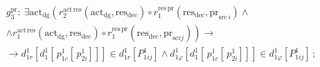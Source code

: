 




\noindent


\begin{multline*}


g_3^{\mathrm{pr}}:\ \exists \mathrm{act}_{\mathrm{dg}}\left( r_2^{\mathrm{act\,res}} \left( 


\mathrm{act}_{\mathrm{dg}}, \mathrm{res}_{\mathrm{dec}}\right)\circ 


r_1^{\mathrm{res\,pr}}


\left( \mathrm{res}_{\mathrm{dec}}, \mathrm{pr}_{\mathrm{src}\,i}\right)\wedge\right.\\


\left.\wedge r_1^{\mathrm{act\,res}} \left( \mathrm{act}_{\mathrm{dg}}, \mathrm{res}_{\mathrm{dec}}\right)


\circ r_1^{\mathrm{res\,pr}}\left( \mathrm{res}_{\mathrm{dec}}, 


\mathrm{pr}_{\mathrm{scr}j}\right)\right)\to{}\\


{}\to d^1_{1r}\left[ d_1^1\left[\, p^1_{1c}\left[\,p^1_{2i}\right]\right]\right]


\in d^1_{1r}\left[ P^1_{1ij}\right]\wedge d^1_{1\varphi}\left[


d_1^1\left[\,p^1_{1c}\left[ \,p^1_{2i}\right]\right]\right]\in d^1_{1\varphi}


\left[ P^1_{1ij}\right]\,;


\end{multline*}





\vspace*{-12pt}





\noindent


